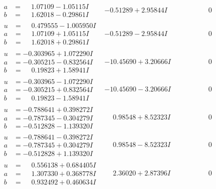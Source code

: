 \documentclass[1p]{elsarticle_modified}
\theoremstyle{definition}
\begin{document}
$$\begin{array}{c|c|c}
\begin{aligned}
a &= \phantom{-}1.07109 - 1.05115 I \\
b &= \phantom{-}1.62018 - 0.29861 I\end{aligned}
 & -0.51289 + 2.95844 I & \phantom{-0.000000 } 0 \\ \hline\begin{aligned}
u &= \phantom{-}0.479555 - 1.005950 I \\
a &= \phantom{-}1.07109 + 1.05115 I \\
b &= \phantom{-}1.62018 + 0.29861 I\end{aligned}
 & -0.51289 - 2.95844 I & \phantom{-0.000000 } 0 \\ \hline\begin{aligned}
u &= -0.303965 + 1.072290 I \\
a &= -0.305215 - 0.832564 I \\
b &= \phantom{-}0.19823 + 1.58941 I\end{aligned}
 & -10.45690 + 3.20666 I & \phantom{-0.000000 } 0 \\ \hline\begin{aligned}
u &= -0.303965 - 1.072290 I \\
a &= -0.305215 + 0.832564 I \\
b &= \phantom{-}0.19823 - 1.58941 I\end{aligned}
 & -10.45690 - 3.20666 I & \phantom{-0.000000 } 0 \\ \hline\begin{aligned}
u &= -0.788641 + 0.398272 I \\
a &= -0.787345 - 0.304279 I \\
b &= -0.512828 - 1.139320 I\end{aligned}
 & \phantom{-}0.98548 + 8.52323 I & \phantom{-0.000000 } 0 \\ \hline\begin{aligned}
u &= -0.788641 - 0.398272 I \\
a &= -0.787345 + 0.304279 I \\
b &= -0.512828 + 1.139320 I\end{aligned}
 & \phantom{-}0.98548 - 8.52323 I & \phantom{-0.000000 } 0 \\ \hline\begin{aligned}
u &= \phantom{-}0.556138 + 0.684405 I \\
a &= \phantom{-}1.307330 + 0.368778 I \\
b &= \phantom{-}0.932492 + 0.460634 I\end{aligned}
 & \phantom{-}2.36020 + 2.87396 I & \phantom{-0.000000 } 0 \\ \hline\begin{aligned}

\end{aligned}
\end{array}$$
\end{document}
